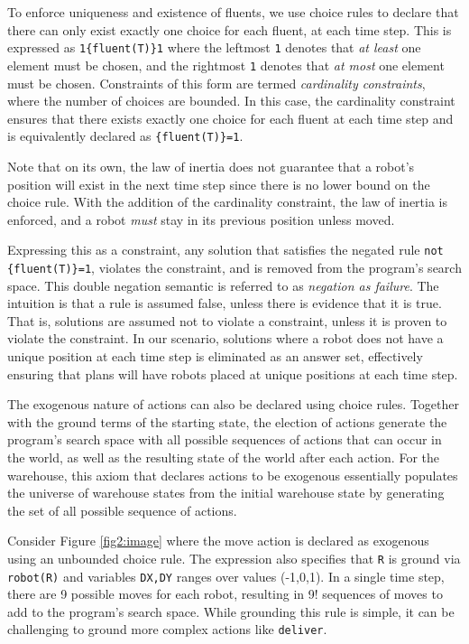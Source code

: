 \documentclass[letterpaper]{article}
\newcommand{\ct}[1]{\texttt{#1}}
\begin{document}
To enforce uniqueness and existence of fluents, we use choice rules to declare that there can only exist exactly one choice for each fluent, at each time step. This is expressed as \ct{1\{fluent(T)\}1} where the leftmost \ct{1} denotes that \emph{at least} one element must be chosen, and the rightmost \ct{1} denotes that \emph{at most} one element must be chosen. Constraints of this form are termed \emph{cardinality constraints}, where the number of choices are bounded. In this case, the cardinality constraint ensures that there exists exactly one choice for each fluent at each time step and is equivalently declared as \ct{\{fluent(T)\}=1}.

Note that on its own, the law of inertia does not guarantee that a robot's position will exist in the next time step since there is no lower bound on the choice rule. With the addition of the cardinality constraint, the law of inertia is enforced, and a robot \emph{must} stay in its previous position unless moved.

Expressing this as a constraint, any solution that satisfies the negated rule \ct{not \{fluent(T)\}=1}, violates the constraint, and is removed from the program's search space. This double negation semantic is referred to as \emph{negation as failure}. The intuition is that a rule is assumed false, unless there is evidence that it is true. That is, solutions are assumed not to violate a constraint, unless it is proven to violate the constraint. In our scenario, solutions where a robot does not have a unique position at each time step is eliminated as an answer set, effectively ensuring that plans will have robots placed at unique positions at each time step.

The exogenous nature of actions can also be declared using choice rules. Together with the ground terms of the starting state, the election of actions generate the program's search space with all possible sequences of actions that can occur in the world, as well as the resulting state of the world after each action. For the warehouse, this axiom that declares actions to be exogenous essentially populates the universe of warehouse states from the initial warehouse state by generating the set of all possible sequence of actions.

Consider Figure \ref{fig2:image} where the move action is declared as exogenous using an unbounded choice rule. The expression also specifies that \ct{R} is ground via \ct{robot(R)} and variables \ct{DX,DY} ranges over values (-1,0,1). In a single time step, there are 9 possible moves for each robot, resulting in 9! sequences of moves to add to the program's search space. While grounding this rule is simple, it can be challenging to ground more complex actions like \ct{deliver}.
\end{document}
